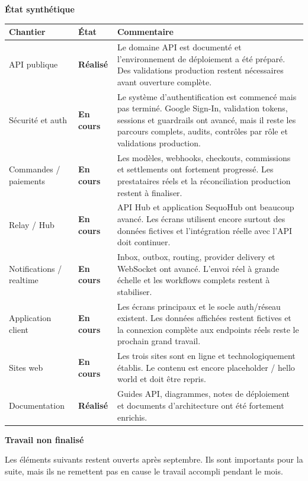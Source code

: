 \documentclass[11pt,letterpaper]{article}
\newcommand{\sectiontitle}[1]{%
  \vspace{0.55em}
  {\Large\bfseries\color{SequoInk}#1}\par
  \vspace{0.1em}
}
\newcommand{\statusdone}{\textbf{\color{SequoGreen}Réalisé}}
\newcommand{\statuspartial}{\textbf{\color{SequoBlue}En cours}}
\begin{document}
\newpage
\sectiontitle{État synthétique}
{\small
\begin{tabularx}{\linewidth}{@{}L{3.2cm}L{2.0cm}Y@{}}
\toprule
{}
\textbf{Chantier} & \textbf{État} & \textbf{Commentaire} \\
\midrule
API publique & \statusdone & Le domaine API est documenté et l'environnement de déploiement a été préparé. Des validations production restent nécessaires avant ouverture complète. \\
Sécurité et auth & \statuspartial & Le système d'authentification est commencé mais pas terminé. Google Sign-In, validation tokens, sessions et guardrails ont avancé, mais il reste les parcours complets, audits, contrôles par rôle et validations production. \\
Commandes / paiements & \statuspartial & Les modèles, webhooks, checkouts, commissions et settlements ont fortement progressé. Les prestataires réels et la réconciliation production restent à finaliser. \\
Relay / Hub & \statuspartial & API Hub et application SequoHub ont beaucoup avancé. Les écrans utilisent encore surtout des données fictives et l'intégration réelle avec l'API doit continuer. \\
Notifications / realtime & \statuspartial & Inbox, outbox, routing, provider delivery et WebSocket ont avancé. L'envoi réel à grande échelle et les workflows complets restent à stabiliser. \\
Application client & \statuspartial & Les écrans principaux et le socle auth/réseau existent. Les données affichées restent fictives et la connexion complète aux endpoints réels reste le prochain grand travail. \\
Sites web & \statuspartial & Les trois sites sont en ligne et technologiquement établis. Le contenu est encore placeholder / hello world et doit être repris. \\
Documentation & \statusdone & Guides API, diagrammes, notes de déploiement et documents d'architecture ont été fortement enrichis. \\
\bottomrule
\end{tabularx}
}

\sectiontitle{Travail non finalisé}
Les éléments suivants restent ouverts après septembre. Ils sont importants pour la suite, mais ils ne remettent pas en cause le travail accompli pendant le mois.
\end{document}
